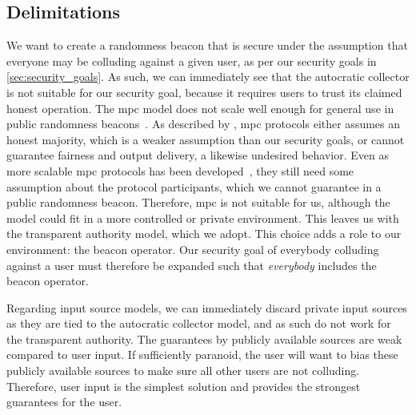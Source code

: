 \subsection{Delimitations}%
\label{sub:delimitations}
We want to create a randomness beacon that is secure under the assumption that everyone may be colluding against a given user, as per our security goals in \cref{sec:security_goals}.
As such, we can immediately see that the autocratic collector is not suitable for our security goal, because it requires users to trust its claimed honest operation.
The \gls{mpc} model does not scale well enough for general use in public randomness beacons~\cite{syta2017scalable}.
As described by \citet{damgaard2006scalable}, \gls{mpc} protocols either assumes an honest majority, which is a weaker assumption than our security goals, or cannot guarantee fairness and output delivery, a likewise undesired behavior.
Even as more scalable \gls{mpc} protocols has been developed~\cite{damgaard2006scalable},  they still need some assumption  about the protocol participants, which we cannot guarantee in a public randomness beacon.
Therefore, \gls{mpc} is not suitable for us, although the model could fit in a more controlled or private environment.
This leaves us with the transparent authority model, which we adopt.
This choice adds a role to our environment: the beacon operator. Our security goal of everybody colluding against a user must therefore be expanded such that \emph{everybody} includes the beacon operator.

Regarding input source models, we can immediately discard private input sources as they are tied to the autocratic collector model, and as such do not work for the transparent authority.
The guarantees by publicly available sources are weak compared to user input.
If sufficiently paranoid, the user will want to bias these publicly available sources to make sure all other users are not colluding.
Therefore, user input is the simplest solution and provides the strongest guarantees for the user.
